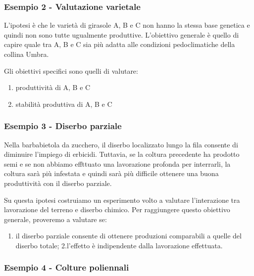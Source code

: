 \documentclass[a4paper,12pt,oneside]{book}
\providecommand{\tightlist}{%
  \setlength{\itemsep}{0pt}\setlength{\parskip}{0pt}}
\begin{document}
\subsubsection{Esempio 2 - Valutazione
varietale}\label{esempio-2---valutazione-varietale}

L'ipotesi è che le varietà di girasole A, B e C non hanno la stessa base
genetica e quindi non sono tutte ugualmente produttive. L'obiettivo
generale è quello di capire quale tra A, B e C sia più adatta alle
condizioni pedoclimatiche della collina Umbra.

Gli obiettivi specifici sono quelli di valutare:

\begin{enumerate}
\def\labelenumi{\arabic{enumi}.}
\tightlist
\item
  produttività di A, B e C
\item
  stabilità produttiva di A, B e C
\end{enumerate}

\subsubsection{Esempio 3 - Diserbo
parziale}\label{esempio-3---diserbo-parziale}

Nella barbabietola da zucchero, il diserbo localizzato lungo la fila
consente di diminuire l'impiego di erbicidi. Tuttavia, se la coltura
precedente ha prodotto semi e se non abbiamo effttuato una lavorazione
profonda per interrarli, la coltura sarà più infestata e quindi sarà più
difficile ottenere una buona produttività con il diserbo parziale.

Su questa ipotesi costruiamo un esperimento volto a valutare
l'interazione tra lavorazione del terreno e diserbo chimico. Per
raggiungere questo obiettivo generale, proveremo a valutare se:

\begin{enumerate}
\def\labelenumi{\arabic{enumi}.}
\tightlist
\item
  il diserbo parziale consente di ottenere produzioni comparabili a
  quelle del diserbo totale; 2.l'effetto è indipendente dalla
  lavorazione effettuata.
\end{enumerate}

\subsubsection{Esempio 4 - Colture
poliennali}\label{esempio-4---colture-poliennali}
\end{document}
